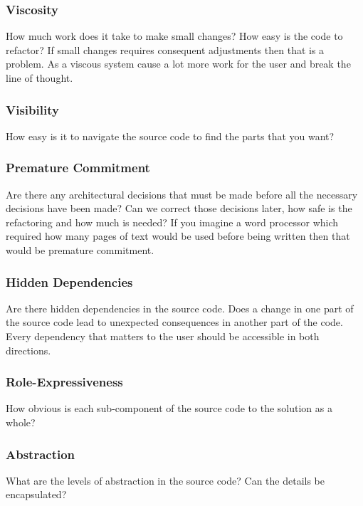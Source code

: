\documentclass[12pt]{article}
\theoremstyle{definition}
\theoremstyle{theorem}
\begin{document}
\subsubsection{Viscosity}

How much work does it take to make small changes? How easy is the code to
refactor? If small changes requires consequent adjustments then that is a
problem. As a viscous system cause a lot more work for the user and break the
line of thought.

\subsubsection{Visibility}

How easy is it to navigate the source code to find the parts that you want?

\subsubsection{Premature Commitment}

Are there any architectural decisions that must be made before all the necessary
decisions have been made? Can we correct those decisions later, how safe is the
refactoring and how much is needed? If you imagine a word processor which
required how many pages of text would be used before being written then
that would be premature commitment.

\subsubsection{Hidden Dependencies}

Are there hidden dependencies in the source code. Does a change in one part of
the source code lead to unexpected consequences in another part of the code.
Every dependency that matters to the user should be accessible in both
directions. 

\subsubsection{Role-Expressiveness}

How obvious is each sub-component of the source code to the solution as a whole?

\subsubsection{Abstraction}

What are the levels of abstraction in the source code? Can the details be
encapsulated?
\end{document}
